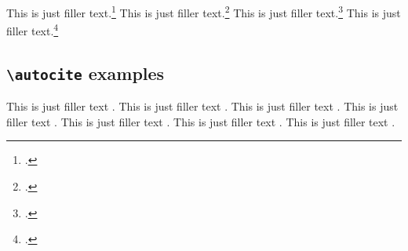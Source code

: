 \documentclass[a4paper]{article}
\newcommand{\cmd}[1]{\texttt{\textbackslash #1}}
\begin{document}
\clearpage

This is just filler text.\footcite{kant:kpv}
This is just filler text.\footcite{kant:ku}
This is just filler text.\footcite[24]{kant:kpv}
This is just filler text.\footcite[59--63]{kant:ku}

\clearpage

\subsection*{\cmd{autocite} examples}


This is just filler text \autocite{aristotle:rhetoric}.
This is just filler text \autocite{averroes/bland}.
This is just filler text \autocite{aristotle:rhetoric}.
This is just filler text \autocite{aristotle:anima}.
This is just filler text \autocite{aristotle:anima}.
This is just filler text \autocite{aristotle:physics}.
This is just filler text \autocite{aristotle:physics}.
\end{document}
